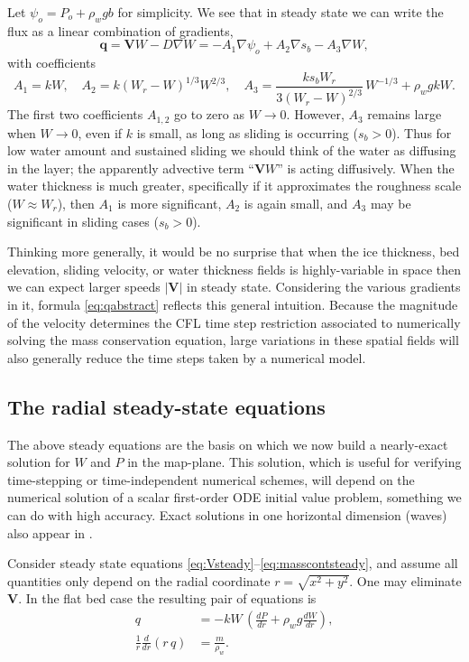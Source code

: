 \documentclass[11pt,final]{amsart}
\newcommand\bV{\mathbf{V}}
\newcommand\bq{\mathbf{q}}
\newcommand{\grad}{\nabla}
\begin{document}
Let $\psi_o = P_o + \rho_w g b$ for simplicity.  We see that in steady state we can write the flux as a linear combination of gradients,
\begin{equation}
\bq = \bV W - D \grad W = - A_1 \grad \psi_o + A_2 \grad s_b - A_3 \grad W,  \label{eq:qabstract}
\end{equation}
with coefficients
\begin{equation}
A_1 = k W, \quad
A_2 = k \left(W_r - W\right)^{1/3} W^{2/3}, \quad
A_3 = \frac{k s_b W_r}{3 (W_r - W)^{2/3}}\, W^{-1/3} + \rho_w g k W.
\end{equation}
The first two coefficients $A_{1,2}$ go to zero as $W\to 0$.  However, $A_3$ remains large when $W\to 0$, even if $k$ is small, as long as sliding is occurring ($s_b > 0$).  Thus for low water amount and sustained sliding we should think of the water as diffusing in the layer; the apparently advective term ``$\bV W$'' is acting diffusively.  When the water thickness is much greater, specifically if it approximates the roughness scale ($W\approx W_r$), then $A_1$ is more significant, $A_2$ is again small, and $A_3$ may be significant in sliding cases ($s_b>0$).

Thinking more generally, it would be no surprise that when the ice thickness, bed elevation, sliding velocity, or water thickness fields is highly-variable in space then we can expect larger speeds $|\bV|$ in steady state.  Considering the various gradients in it, formula \eqref{eq:qabstract} reflects this general intuition.  Because the magnitude of the velocity determines the CFL time step restriction \citep{MortonMayers} associated to numerically solving the mass conservation equation, large variations in these spatial fields will also generally reduce the time steps taken by a numerical model.

\subsection*{The radial steady-state equations}  The above steady equations are the basis on which we now build a nearly-exact solution for $W$ and $P$ in the map-plane.  This solution, which is useful for verifying time-stepping or time-independent numerical schemes, will depend on the numerical solution of a scalar first-order ODE initial value problem, something we can do with high accuracy.  Exact solutions in one horizontal dimension (waves) also appear in \cite{Schoofetal2012}.

Consider steady state equations \eqref{eq:Vsteady}--\eqref{eq:masscontsteady}, and assume all quantities only depend on the radial coordinate $r = \sqrt{x^2+y^2}$.  One may eliminate $\bV$.  In the flat bed case the resulting pair of equations is
\begin{align}
q &= - k W\, \left(\frac{dP}{dr} + \rho_w g \frac{dW}{dr}\right), \label{eq:rsflux} \\
\frac{1}{r}\frac{d}{dr}\left(r\,q\right) &= \frac{m}{\rho_w}. \label{eq:rsconserve}
\end{align}
\end{document}
